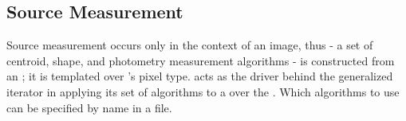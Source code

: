 \subsection{Source Measurement}

Source measurement occurs only in the context of an image, thus 
 - a set of centroid, shape, and photometry measurement 
algorithms - is constructed from an ; it is templated over 
's pixel type.   acts as the driver behind
the generalized  iterator  in applying 
its set of algorithms to a  over the . 
Which algorithms to use can be specified by name in a  file.

